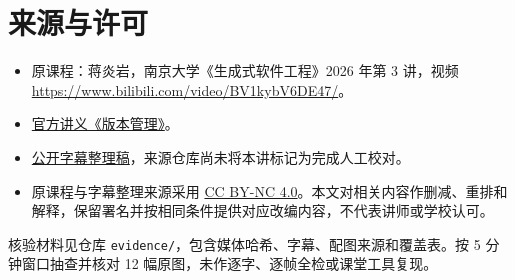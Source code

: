 \documentclass[
  11pt,
  fontset=fandol]{ctexart}
\providecommand{\tightlist}{%
  \setlength{\itemsep}{0pt}\setlength{\parskip}{0pt}}
\begin{document}
\enlargethispage{3\baselineskip}

\section{来源与许可}\label{ux6765ux6e90ux4e0eux8bb8ux53ef}

\begin{itemize}
\tightlist
\item
  原课程：蒋炎岩，南京大学《生成式软件工程》2026 年第 3 讲，视频
  \url{https://www.bilibili.com/video/BV1kybV6DE47/}。
\item
  \href{https://jyywiki.cn/GSE/2026/lect3.md}{官方讲义《版本管理》}。
\item
  \href{https://github.com/NinZeige/NJU-2026-GSE-Captions/tree/main/release/03-软件仓库管理}{公开字幕整理稿}，来源仓库尚未将本讲标记为完成人工校对。
\item
  原课程与字幕整理来源采用
  \href{https://creativecommons.org/licenses/by-nc/4.0/}{CC BY-NC
  4.0}。本文对相关内容作删减、重排和解释，保留署名并按相同条件提供对应改编内容，不代表讲师或学校认可。
\end{itemize}

核验材料见仓库
\texttt{evidence/}，包含媒体哈希、字幕、配图来源和覆盖表。按 5
分钟窗口抽查并核对 12 幅原图，未作逐字、逐帧全检或课堂工具复现。
\end{document}
